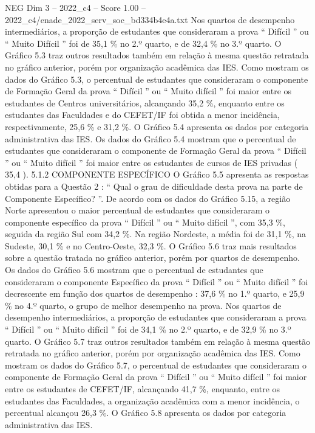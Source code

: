 \begin{textsample}{NEG Dim 3 – 2022\_c4 – Score 1.00 – 2022\_c4/enade\_2022\_serv\_soc\_bd334b4e4a.txt}
Nos quartos de desempenho intermediários, a proporção de estudantes que consideraram a prova “ Difícil ” ou “ Muito Difícil ” foi de 35,1 \% no 2.º quarto, e de 32,4 \% no 3.º quarto.
O Gráfico 5.3 traz outros resultados também em relação à mesma questão retratada no gráfico anterior, porém por organização acadêmica das IES.
Como mostram os dados do Gráfico 5.3, o percentual de estudantes que consideraram o componente de Formação Geral da prova “ Difícil ” ou “ Muito difícil ” foi maior entre os estudantes de Centros universitários, alcançando 35,2 \%, enquanto entre os estudantes das Faculdades e do CEFET/IF foi obtida a menor incidência, respectivamente, 25,6 \% e 31,2 \%.
O Gráfico 5.4 apresenta os dados por categoria administrativa das IES.
Os dados do Gráfico 5.4 mostram que o percentual de estudantes que consideraram o componente de Formação Geral da prova “ Difícil ” ou “ Muito difícil ” foi maior entre os estudantes de cursos de IES privadas ( 35,4 ). 5.1.2 COMPONENTE ESPECÍFICO O Gráfico 5.5 apresenta as respostas obtidas para a Questão 2 : “ Qual o grau de dificuldade desta prova na parte de Componente Específico? ”.
De acordo com os dados do Gráfico 5.15, a região Norte apresentou o maior percentual de estudantes que consideraram o componente específico da prova “ Difícil ” ou “ Muito difícil ”, com 35,3 \%, seguida da região Sul com 34,2 \%.
Na região Nordeste, a média foi de 31,1 \%, na Sudeste, 30,1 \% e no Centro-Oeste, 32,3 \%.
O Gráfico 5.6 traz mais resultados sobre a questão tratada no gráfico anterior, porém por quartos de desempenho.
Os dados do Gráfico 5.6 mostram que o percentual de estudantes que consideraram o componente Específico da prova “ Difícil ” ou “ Muito difícil ” foi decrescente em função dos quartos de desempenho : 37,6 \% no 1.º quarto, e 25,9 \% no 4.º quarto, o grupo de melhor desempenho na prova.
Nos quartos de desempenho intermediários, a proporção de estudantes que consideraram a prova “ Difícil ” ou “ Muito difícil ” foi de 34,1 \% no 2.º quarto, e de 32,9 \% no 3.º quarto.
O Gráfico 5.7 traz outros resultados também em relação à mesma questão retratada no gráfico anterior, porém por organização acadêmica das IES.
Como mostram os dados do Gráfico 5.7, o percentual de estudantes que consideraram o componente de Formação Geral da prova “ Difícil ” ou “ Muito difícil ” foi maior entre os estudantes de CEFET/IF, alcançando 41,7 \%, enquanto, entre os estudantes das Faculdades, a organização acadêmica com a menor incidência, o percentual alcançou 26,3 \%.
O Gráfico 5.8 apresenta os dados por categoria administrativa das IES.

\end{textsample}
